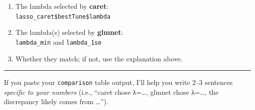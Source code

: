 \documentclass[
]{article}
\begin{document}
\begin{enumerate}
\def\labelenumi{\arabic{enumi})}
\item
  The lambda selected by \textbf{caret}:\\
  \texttt{lasso\_caret\$bestTune\$lambda}
\item
  The lambda(s) selected by \textbf{glmnet}:\\
  \texttt{lambda\_min} and \texttt{lambda\_1se}
\item
  Whether they match; if not, use the explanation above.
\end{enumerate}

\begin{center}\rule{0.5\linewidth}{0.5pt}\end{center}

If you paste your \texttt{comparison} table output, I'll help you write
2--3 sentences \emph{specific to your numbers} (i.e., ``caret chose
λ=\ldots, glmnet chose λ=\ldots, the discrepancy likely comes from
\ldots{}'').
\end{document}

